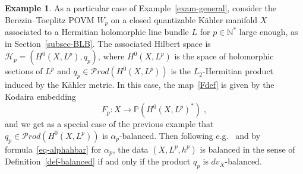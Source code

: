 \documentclass[11pt]{article}
\theoremstyle{definition}
\newtheorem{exam}[theo]{Example}
\numberwithin{equation}{section}
\numberwithin{figure}{section}
\numberwithin{table}{section}
\newcommand{\PPP}{{\mathbb{P}}}
\newcommand{\N}{{\mathbb{N}}}
\newcommand{\cH}{{\mathcal{H}}}
\newcommand\< {\mathcal{h}}
\renewcommand\> {\mathcal{i}}
\newcommand{\Prod}{{\mathcal Prod}}
\begin{document}
\begin{exam}\label{exam-cloudK}
As a particular case of Example~\ref{exam-general}, consider the Berezin--Toeplitz POVM $W_p$ on a closed quantizable K\"ahler manifold $X$ associated to a Hermitian holomorphic line bundle $L$ for $p\in\N^*$ large enough, as in Section~\ref{subsec-BLB}. The associated Hilbert space is $\cH_p=(H^0(X,L^p),q_p)$, where $H^0(X,L^p)$ is the space of holomorphic sections of $L^p$ and $q_p\in\Prod(H^0(X,L^p))$ is the $L_2$-Hermitian product induced by the K\"ahler metric. In this case, the map~\eqref{Fdef} is given by the Kodaira embedding
\begin{equation}\label{Kodemb}
F_p: X \longrightarrow \PPP\left(H^0(X,L^p)^*\right)\;,
\end{equation}
and we get as a special case of the previous example that $q_p\in\Prod(H^0(X,L^p))$ is $\alpha_p$-balanced. Then following e.g.~\cite[Proposition~8.3]{Fine-lectures} and by formula~\eqref{eq-alphahbar} for $\alpha_p$, the data $(X,L^p,h^p)$ is balanced in the sense of Definition~\ref{def-balanced} if and only if the product $q_p$ is $dv_X$-balanced.
\end{exam}
\end{document}
